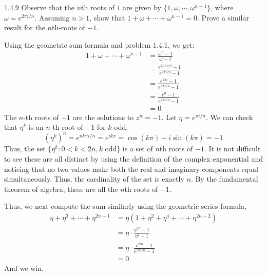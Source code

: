 \documentclass[12pt]{amsart}
\begin{document}
\begin{problem}{1.4.9}
    Observe that the $n$th roots of $1$ are given by $\{1, \omega, \cdots, \omega^{n-1}\}$, where $\omega = e^{2\pi i/n}$. Assuming $n > 1$, show that $1+\omega+\cdots+\omega^{n-1} = 0$. Prove a similar result for the $n$th-roots of $-1$. 
\end{problem}
\begin{solution}
    Using the geometric sum formula and problem 1.4.1, we get: 
    \begin{align*}
        1 + \omega + \cdots + \omega^{n-1} &= \frac{\omega^n -1}{\omega -1} \\
        &= \frac{e^{2n\pi i/n}-1}{e^{2\pi i/n}-1} \\
        &= \frac{e^{2\pi i}-1}{e^{2\pi i/n}-1} \\
        &= \frac{e^0 - 1}{e^{2\pi i/n}-1} \\
        &= 0     
    \end{align*}
    The $n$-th roots of $-1$ are the solutions to $z^n = -1$. Let $\eta = e^{\pi i/n}$. We can check that $\eta^k$ is an $n$-th root of $-1$ for $k$ odd, 
    \[ (\eta^k)^n = e^{nk\pi i/n} = e^{ik\pi} = \cos(k\pi) + i\sin(k\pi) = -1\]
    Thus, the set $\{\eta^k : 0 < k < 2n, k \text{ odd}\}$ is a set of $n$th roots of $-1$. It is not difficult to see these are all distinct by using the definition of the complex exponential and noticing that no two values make both the real and imaginary components equal simultaneously. Thus, the cardinality of the set is exactly $n$. By the fundamental theorem of algebra, these are all the $n$th roots of $-1$. 

    Thus, we next compute the sum similarly using the geometric series formula, 
    \begin{align*}
        \eta + \eta^3 + \cdots + \eta^{2n-1}
        &= \eta\left(1+\eta^2+\eta^4+\cdots+\eta^{2n-2}\right) \\
        &= \eta \cdot \frac{\eta^{2n}-1}{\eta^2-1} \\
        &= \eta \cdot \frac{e^{2\pi i}-1}{e^{2\pi i/n}-1} \\
        &= 0
    \end{align*}
    And we win. 
\end{solution}
\newpage
\end{document}
